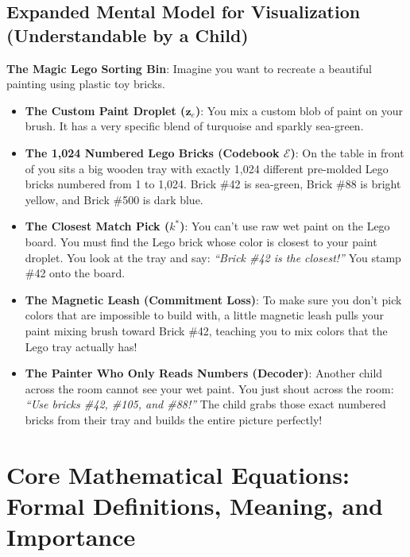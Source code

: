 \documentclass[11pt,a4paper]{article}
\theoremstyle{definition}
\begin{document}
\subsection{Expanded Mental Model for Visualization (Understandable by a Child)}
\textbf{The Magic Lego Sorting Bin}:
Imagine you want to recreate a beautiful painting using plastic toy bricks.
\begin{itemize}
    \item \textbf{The Custom Paint Droplet ($\mathbf{z}_e$)}:
    You mix a custom blob of paint on your brush. It has a very specific blend of turquoise and sparkly sea-green.
    
    \item \textbf{The 1,024 Numbered Lego Bricks (Codebook $\mathcal{E}$)}:
    On the table in front of you sits a big wooden tray with exactly 1,024 different pre-molded Lego bricks numbered from 1 to 1,024. Brick \#42 is sea-green, Brick \#88 is bright yellow, and Brick \#500 is dark blue.
    
    \item \textbf{The Closest Match Pick ($k^*$)}:
    You can't use raw wet paint on the Lego board. You must find the Lego brick whose color is closest to your paint droplet. You look at the tray and say: \emph{``Brick \#42 is the closest!''} You stamp \#42 onto the board.
    
    \item \textbf{The Magnetic Leash (Commitment Loss)}:
    To make sure you don't pick colors that are impossible to build with, a little magnetic leash pulls your paint mixing brush toward Brick \#42, teaching you to mix colors that the Lego tray actually has!
    
    \item \textbf{The Painter Who Only Reads Numbers (Decoder)}:
    Another child across the room cannot see your wet paint. You just shout across the room: \emph{``Use bricks \#42, \#105, and \#88!''} The child grabs those exact numbered bricks from their tray and builds the entire picture perfectly!
\end{itemize}

\section{Core Mathematical Equations: Formal Definitions, Meaning, and Importance}
\end{document}
